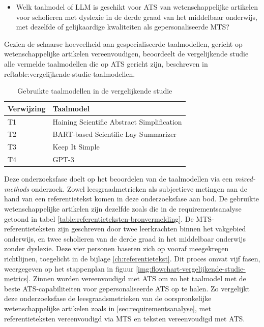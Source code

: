 \begin{itemize}
	\item Welk taalmodel of LLM is geschikt voor ATS van wetenschappelijke artikelen voor scholieren met dyslexie in de derde graad van het middelbaar onderwijs, met dezelfde of gelijkaardige kwaliteiten als gepersonaliseerde MTS?
\end{itemize}

Gezien de schaarse hoeveelheid aan gespecialiseerde taalmodellen, gericht op wetenschappelijke artikelen vereenvoudigen, beoordeelt de vergelijkende studie alle vermelde taalmodellen die op ATS gericht zijn, beschreven in ref{table:vergelijkende-studie-taalmodellen}.

\begin{center}
	\begin{table}[H]
		\begin{tabular}{ | m{4cm} | m{11cm} | } 
			\hline
			\textbf{Verwijzing} & \textbf{Taalmodel} \\
			\hline
			T1 & Haining Scientific Abstract Simplification \\
			\hline
			T2 & BART-based Scientific Lay Summarizer \\
			\hline
			T3 & Keep It Simple\\
			\hline
			T4 & GPT-3 \\
			\hline
		\end{tabular}
		\caption{Gebruikte taalmodellen in de vergelijkende studie}
		\label{table:vergelijkende-studie-taalmodellen}
	\end{table}
\end{center}

Deze onderzoeksfase doelt op het beoordelen van de taalmodellen via een \textit{mixed-methods} onderzoek. Zowel leesgraadmetrieken als subjectieve metingen aan de hand van een referentietekst komen in deze onderzoeksfase aan bod. De gebruikte wetenschappelijke artikelen zijn dezelfde zoals die in de requirementsanalyse getoond in tabel \ref{table:referentieteksten-bronvermelding}. De MTS-referentieteksten zijn geschreven door twee leerkrachten binnen het vakgebied onderwijs, en twee scholieren van de derde graad in het middelbaar onderwijs zonder dyslexie. Deze vier personen baseren zich op vooraf meegekregen richtlijnen, toegelicht in de bijlage \ref{ch:referentietekst}.  Dit proces omvat vijf fasen, weergegeven op het stappenplan in figuur \ref{img:flowchart-vergelijkende-studie-metrics}. Zinnen worden vereenvoudigd met ATS om zo het taalmodel met de beste ATS-capabiliteiten voor gepersonaliseerde ATS op te halen. Zo vergelijkt deze onderzoeksfase de leesgraadsmetrieken van de oorspronkelijke wetenschappelijke artikelen zoals in \ref{sec:requirementsanalyse}, met referentieteksten vereenvoudigd via MTS en teksten vereenvoudigd met ATS. 

